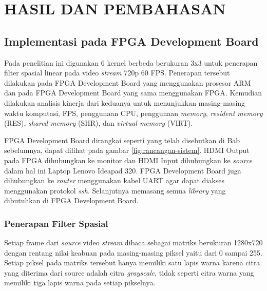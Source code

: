 
\chapter{HASIL DAN PEMBAHASAN}


\section{Implementasi pada FPGA Development Board}

Pada penelitian ini digunakan 6 kernel berbeda berukuran 3x3 untuk penerapan filter spasial linear pada video \textit{stream} 720p 60 FPS. Penerapan tersebut dilakukan pada FPGA Development Board yang menggunakan prosesor ARM dan pada FPGA Development Board yang sama menggunakan FPGA. Kemudian dilakukan analisis kinerja dari keduanya untuk menunjukkan masing-masing waktu komputasi, FPS, penggunaan CPU, penggunaan \textit{memory}, \textit{resident memory} (RES), \textit{shared memory} (SHR), dan \textit{virtual memory} (VIRT).

FPGA Development Board dirangkai seperti yang telah disebutkan di Bab sebelumnya, dapat dilihat pada gambar \ref{fig:rancangan-sistem}. HDMI Output pada FPGA dihubungkan ke monitor dan HDMI Input dihubungkan ke \textit{source} dalam hal ini Laptop Lenovo Ideapad 320. FPGA Development Board juga dihubungkan ke \textit{router} menggunakan kabel UART agar dapat diakses menggunakan protokol \textit{ssh}. Selanjutnya memasang semua \textit{library} yang dibutuhkan di FPGA Development Board.

\subsection{Penerapan Filter Spasial}
Setiap frame dari \textit{source} video \textit{stream} dibaca sebagai matriks berukuran 1280x720 dengan rentang nilai keabuan pada masing-masing piksel yaitu dari 0 sampai 255. Setiap piksel pada matriks tersebut hanya memiliki satu lapis warna karena citra yang diterima dari source adalah citra \textit{grayscale}, tidak seperti citra warna yang memiliki tiga lapis warna pada setiap pikselnya. 

